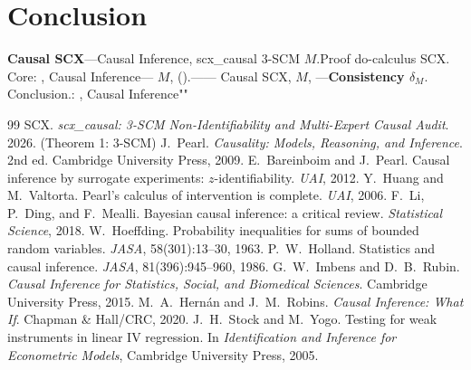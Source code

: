 \documentclass[11pt,a4paper,twoside]{article}
\begin{document}
\section{Conclusion}
 \textbf{Causal SCX}---Causal Inference, scx\_causal 
3-SCM $M$.Proof
 do-calculus SCX.
Core: , 
Causal Inference--- $M$, 
().------
Causal SCX, $M$, 
---\textbf{Consistency $\delta_M$}.
Conclusion.: , Causal Inference""
\begin{thebibliography}{99}
SCX.
\emph{scx\_causal: 3-SCM Non-Identifiability and Multi-Expert Causal Audit}.
2026.
(Theorem 1: 3-SCM)
J.~Pearl.
\emph{Causality: Models, Reasoning, and Inference}. 2nd ed.
Cambridge University Press, 2009.
E.~Bareinboim and J.~Pearl.
Causal inference by surrogate experiments: $z$-identifiability.
\emph{UAI}, 2012.
Y.~Huang and M.~Valtorta.
Pearl's calculus of intervention is complete.
\emph{UAI}, 2006.
F.~Li, P.~Ding, and F.~Mealli.
Bayesian causal inference: a critical review.
\emph{Statistical Science}, 2018.
W.~Hoeffding.
Probability inequalities for sums of bounded random variables.
\emph{JASA}, 58(301):13--30, 1963.
P.~W.~Holland.
Statistics and causal inference.
\emph{JASA}, 81(396):945--960, 1986.
G.~W.~Imbens and D.~B.~Rubin.
\emph{Causal Inference for Statistics, Social, and Biomedical Sciences}.
Cambridge University Press, 2015.
M.~A.~Hern\'an and J.~M.~Robins.
\emph{Causal Inference: What If}.
Chapman \& Hall/CRC, 2020.
J.~H.~Stock and M.~Yogo.
Testing for weak instruments in linear IV regression.
In \emph{Identification and Inference for Econometric Models},
Cambridge University Press, 2005.
\end{thebibliography}
\appendix
\end{document}

